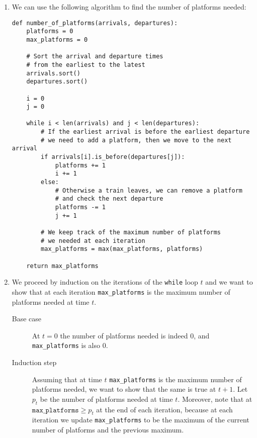 \documentclass[10pt]{article}
\begin{document}
\begin{enumerate}
    \item We can use the following algorithm to find the number of platforms needed:

          \begin{verbatim}
def number_of_platforms(arrivals, departures):
    platforms = 0
    max_platforms = 0

    # Sort the arrival and departure times
    # from the earliest to the latest
    arrivals.sort()
    departures.sort()

    i = 0
    j = 0

    while i < len(arrivals) and j < len(departures):
        # If the earliest arrival is before the earliest departure
        # we need to add a platform, then we move to the next arrival
        if arrivals[i].is_before(departures[j]): 
            platforms += 1
            i += 1
        else:
            # Otherwise a train leaves, we can remove a platform
            # and check the next departure
            platforms -= 1
            j += 1

        # We keep track of the maximum number of platforms
        # we needed at each iteration
        max_platforms = max(max_platforms, platforms)
    
    return max_platforms
        \end{verbatim}

    \item
          We proceed by induction on the iterations of the \texttt{while} loop $t$ and we want to show that at each iteration \texttt{max\_platforms} is the maximum number of platforms needed at time $t$.

          \begin{description}
              \item[Base case] At $t = 0$ the number of platforms needed is indeed 0, and \texttt{max\_platforms} is also 0.
              \item[Induction step] Assuming that at time $t$ \texttt{max\_platforms} is the maximum number of platforms needed, we want to show that the same is true at $t + 1$.
                    Let $p_t$ be the number of platforms needed at time $t$.
                    Moreover, note that at $\texttt{max\_platforms} \geq p_t$ at the end of each iteration, because at each iteration we update \texttt{max\_platforms} to be the maximum of the current number of platforms and the previous maximum.


\end{description}
\end{enumerate}
\end{document}
